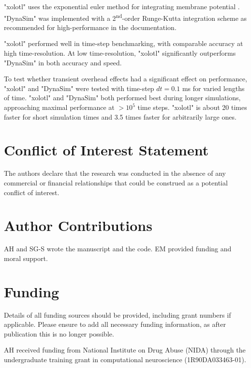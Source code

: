 \documentclass{frontiersSCNS} %
\begin{document}
"xolotl" uses the exponential euler method for integrating membrane potential \autocite{dayanTheoreticalNeuroscience2001}. "DynaSim" was implemented with a 2\textsuperscript{nd}-order Runge-Kutta integration scheme as recommended for high-performance in the documentation.

"xolotl" performed well in time-step benchmarking, with comparable accuracy at high time-resolution. At low time-resolution, "xolotl" significantly outperforms "DynaSim" in both accuracy and speed.

To test whether transient overhead effects had a significant effect on performance, "xolotl" and "DynaSim" were tested with time-step $dt = 0.1$ ms for varied lengths of time. "xolotl" and "DynaSim" both performed best during longer simulations, approaching maximal performance at $>10^5$ time steps. "xolotl" is about 20 times faster for short simulation times and 3.5 times faster for arbitrarily large ones.

\section*{Conflict of Interest Statement}

The authors declare that the research was conducted in the absence of any commercial or financial relationships that could be construed as a potential conflict of interest.

\section*{Author Contributions}

AH and SG-S wrote the manuscript and the code. EM provided funding and moral support.

\section*{Funding}
Details of all funding sources should be provided, including grant numbers if applicable. Please ensure to add all necessary funding information, as after publication this is no longer possible.

AH received funding from National Institute on Drug Abuse (NIDA) through the undergraduate training grant in computational neuroscience (1R90DA033463-01).
\end{document}
